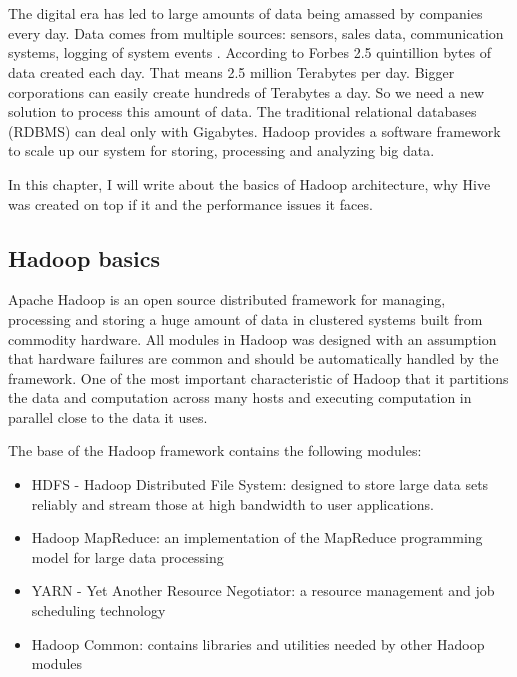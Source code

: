 \chapter{\bevezetes}


The digital era has led to large amounts of data being amassed by companies every day. Data comes from multiple sources: sensors, sales data, communication systems, logging of system events \etc. According to Forbes \cite{Forbes} 2.5 quintillion bytes of data created each day. That means 2.5 million Terabytes per day. Bigger corporations can easily create hundreds of Terabytes a day. So we need a new solution to process this amount of data. The traditional relational databases (RDBMS) can deal only with Gigabytes. Hadoop provides a software framework to scale up our system for storing, processing and analyzing big data.

In this chapter, I will write about the basics of Hadoop architecture, why Hive was created on top if it and the performance issues it faces.

\section{Hadoop basics}
Apache Hadoop is an open source distributed framework for managing, processing  and storing a huge amount of data in clustered systems built from commodity hardware. All modules in Hadoop was designed with an assumption that hardware failures are common and should be automatically handled by the framework. One of the most important characteristic of Hadoop that it partitions the data and computation across many hosts and executing computation in parallel close to the data it uses.  \cite{Hadoop-wiki}

The base of the Hadoop framework contains the following modules:
\begin{itemize}
	\item HDFS - Hadoop Distributed File System: designed to store large data sets reliably and stream those at high bandwidth to user applications.
	\item Hadoop MapReduce: an implementation of the MapReduce programming model for large data processing
	\item YARN - Yet Another Resource Negotiator: a resource management and job scheduling technology
	\item Hadoop Common: contains libraries and utilities needed by other Hadoop modules
\end{itemize}
